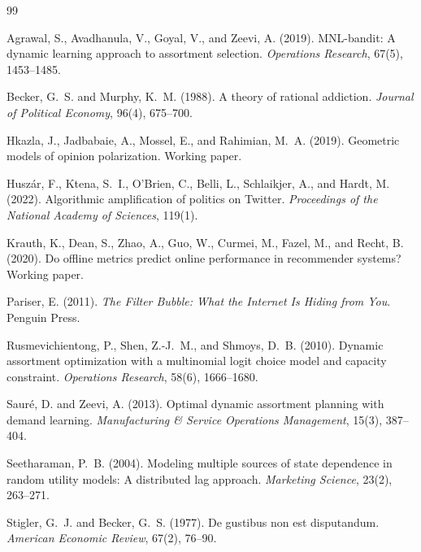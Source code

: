 \documentclass[11pt]{article}
\begin{document}
\begin{thebibliography}{99}

Agrawal, S., Avadhanula, V., Goyal, V., and Zeevi, A. (2019).
MNL-bandit: A dynamic learning approach to assortment selection.
\textit{Operations Research}, 67(5), 1453--1485.

Becker, G.~S. and Murphy, K.~M. (1988).
A theory of rational addiction.
\textit{Journal of Political Economy}, 96(4), 675--700.

Hkazla, J., Jadbabaie, A., Mossel, E., and Rahimian, M.~A. (2019).
Geometric models of opinion polarization.
Working paper.

Husz{\'a}r, F., Ktena, S.~I., O'Brien, C., Belli, L., Schlaikjer, A., and Hardt, M. (2022).
Algorithmic amplification of politics on Twitter.
\textit{Proceedings of the National Academy of Sciences}, 119(1).

Krauth, K., Dean, S., Zhao, A., Guo, W., Curmei, M., Fazel, M., and Recht, B. (2020).
Do offline metrics predict online performance in recommender systems?
Working paper.

Pariser, E. (2011).
\textit{The Filter Bubble: What the Internet Is Hiding from You}.
Penguin Press.

Rusmevichientong, P., Shen, Z.-J.~M., and Shmoys, D.~B. (2010).
Dynamic assortment optimization with a multinomial logit choice model and capacity constraint.
\textit{Operations Research}, 58(6), 1666--1680.

Saur{\'e}, D. and Zeevi, A. (2013).
Optimal dynamic assortment planning with demand learning.
\textit{Manufacturing \& Service Operations Management}, 15(3), 387--404.

Seetharaman, P.~B. (2004).
Modeling multiple sources of state dependence in random utility models: A distributed lag approach.
\textit{Marketing Science}, 23(2), 263--271.

Stigler, G.~J. and Becker, G.~S. (1977).
De gustibus non est disputandum.
\textit{American Economic Review}, 67(2), 76--90.

\end{thebibliography}
\end{document}
